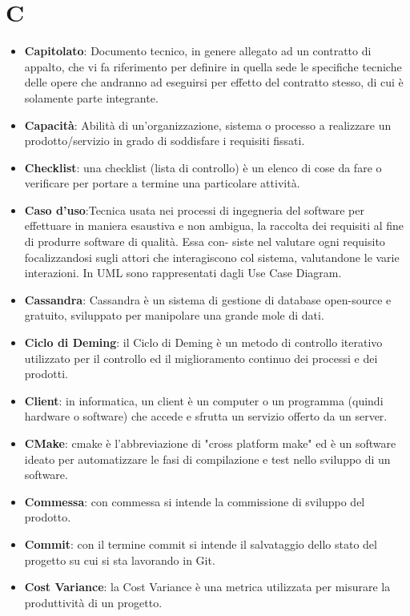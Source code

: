 \documentclass[a4paper, oneside, openany]{article}
\begin{document}
\section{C}
\begin{itemize}
\item \textbf{Capitolato}: Documento tecnico, in genere allegato ad un contratto di appalto, che vi fa riferimento per definire in quella sede le specifiche tecniche delle opere che andranno ad eseguirsi per effetto del contratto stesso, di cui è solamente parte integrante. 
\item \textbf{Capacità}: Abilità di un'organizzazione, sistema o processo a realizzare un prodotto/servizio in grado di soddisfare i requisiti fissati.
\item \textbf{Checklist}: una checklist  (lista di controllo) è un elenco di cose da fare o verificare per portare a termine una particolare attività.
\item \textbf{Caso d'uso}:Tecnica usata nei processi di ingegneria del software per effettuare in maniera esaustiva
e non ambigua, la raccolta dei requisiti al fine di produrre software di qualità. Essa con-
siste nel valutare ogni requisito focalizzandosi sugli attori che interagiscono col sistema,
valutandone le varie interazioni. In UML sono rappresentati dagli Use Case Diagram.
\item \textbf{Cassandra}: Cassandra è un sistema di gestione di database  open-source e gratuito, sviluppato per manipolare una grande mole di dati.
\item \textbf{Ciclo di Deming}: il Ciclo di Deming è un metodo di controllo iterativo utilizzato per il controllo ed il miglioramento continuo dei processi e dei prodotti.
\item \textbf{Client}: in informatica, un client è un computer o un programma (quindi hardware o software) che accede e sfrutta un servizio offerto da un server.
\item \textbf{CMake}: cmake è l'abbreviazione di "cross platform make" ed è un software ideato per automatizzare le fasi di compilazione e test nello sviluppo di un software.
\item \textbf{Commessa}: con commessa si intende la commissione di sviluppo del prodotto.
\item \textbf{Commit}: con il termine commit si intende il salvataggio dello stato del progetto su cui si sta lavorando in Git.
\item \textbf{Cost Variance}: la Cost Variance è una metrica utilizzata per misurare la produttività di un progetto.

\end{itemize}
\end{document}
